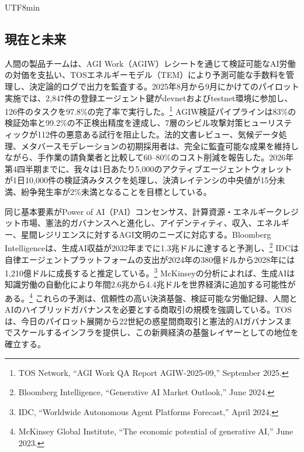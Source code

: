 \documentclass[11pt]{article}
\begin{document}
\begin{CJK}{UTF8}{min}
\subsection{現在と未来}
\begin{description}[leftmargin=2.1cm, style=nextline]
  \item[12--24ヶ月] 人間の製品チームは、AGI Work（AGIW）レシートを通じて検証可能なAI労働の対価を支払い、TOSエネルギーモデル（TEM）により予測可能な手数料を管理し、決定論的ログで出力を監査する。2025年8月から9月にかけてのパイロット実施では、2,847件の登録エージェント鍵がdevnetおよびtestnet環境に参加し、126件のタスクを97.8\%の完了率で実行した。\footnote{TOS Network, ``AGI Work QA Report AGIW-2025-09,'' September 2025.} AGIW検証パイプラインは83\%の検証効率と99.2\%の不正検出精度を達成し、7層のシビル攻撃対策ヒューリスティックが112件の悪意ある試行を阻止した。法的文書レビュー、気候データ処理、メタバースモデレーションの初期採用者は、完全に監査可能な成果を維持しながら、手作業の請負業者と比較して60--80\%のコスト削減を報告した。2026年第4四半期までに、我々は1日あたり5,000のアクティブエージェントウォレットが1日10,000件の検証済みタスクを処理し、決済レイテンシの中央値が15分未満、紛争発生率が2\%未満となることを目標としている。

  \item[100年の展開] 同じ基本要素がPower of AI（PAI）コンセンサス、計算資源・エネルギークレジット市場、憲法的ガバナンスへと進化し、アイデンティティ、収入、エネルギー、星間レジリエンスに対するAGI文明のニーズに対応する。Bloomberg Intelligenceは、生成AI収益が2032年までに1.3兆ドルに達すると予測し、\footnote{Bloomberg Intelligence, ``Generative AI Market Outlook,'' June 2024.} IDCは自律エージェントプラットフォームの支出が2024年の380億ドルから2028年には1,210億ドルに成長すると推定している。\footnote{IDC, ``Worldwide Autonomous Agent Platforms Forecast,'' April 2024.} McKinseyの分析によれば、生成AIは知識労働の自動化により年間2.6兆から4.4兆ドルを世界経済に追加する可能性がある。\footnote{McKinsey Global Institute, ``The economic potential of generative AI,'' June 2023.} これらの予測は、信頼性の高い決済基盤、検証可能な労働記録、人間とAIのハイブリッドガバナンスを必要とする商取引の規模を強調している。TOSは、今日のパイロット展開から22世紀の惑星間商取引と憲法的AIガバナンスまでスケールするインフラを提供し、この新興経済の基盤レイヤーとしての地位を確立する。
\end{description}


\end{CJK}
\end{document}
